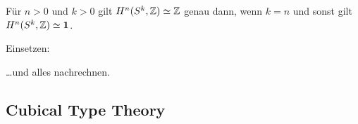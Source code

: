 \begin{korollar}
  Für $n>0$ und $k>0$ gilt $H^n(S^k,\mathbb{Z})\simeq \mathbb{Z}$ genau dann, wenn $k=n$ und sonst gilt $H^n(S^k,\mathbb{Z})\simeq \mathbf{1}$.
\end{korollar}
\begin{beweis}[Idee]
  Einsetzen:
  \begin{center}
  \end{center}
  \dots und alles nachrechnen.
\end{beweis}

\subsection{Cubical Type Theory}
